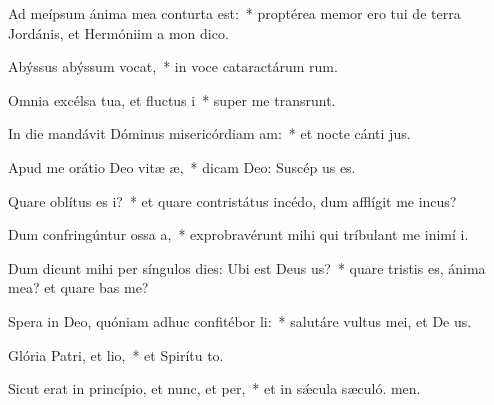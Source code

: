 \item Ad meípsum ánima mea conturta est:~* proptérea memor ero tui de terra Jordánis, et Hermóniim a mon dico.
\item Abýssus abýssum vocat,~* in voce cataractárum rum.
\item Omnia excélsa tua, et fluctus i~* super me transrunt.
\item In die mandávit Dóminus misericórdiam am:~* et nocte cánti jus.
\item Apud me orátio Deo vitæ æ,~* dicam Deo: Suscép us es.
\item Quare oblítus es i?~* et quare contristátus incédo, dum afflígit me incus?
\item Dum confringúntur ossa a,~* exprobravérunt mihi qui tríbulant me inimí i.
\item Dum dicunt mihi per síngulos dies: Ubi est Deus us?~* quare tristis es, ánima mea? et quare bas me?
\item Spera in Deo, quóniam adhuc confitébor li:~* salutáre vultus mei, et De us.
\item Glória Patri, et lio,~* et Spirítu to.
\item Sicut erat in princípio, et nunc, et per,~* et in sǽcula sæculó. men.
